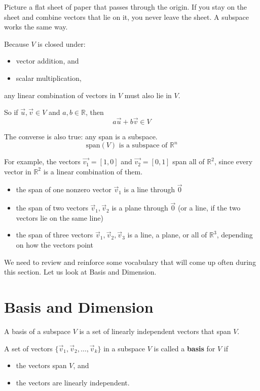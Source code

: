 Picture a flat sheet of paper that passes through the origin. If you stay on the sheet and combine vectors that lie on it, you never leave the sheet. A subspace works the same way.

Because $V$ is closed under:

\begin{itemize}
    \item vector addition, and
    \item scalar multiplication,
\end{itemize}

any linear combination of vectors in $V$ must also lie in $V$.

So if $\vec{u},\vec{v} \in V$ and $a,b \in \mathbb{R}$, then
$$a\vec{u} + b\vec{v} \in V$$

The converse is also true: any span is a subspace.
$$\text{span}(V) \text{ is a subspace of } \mathbb{R}^n$$

For example, the vectors $\vec{v_{1}}= [1, 0]$ and $\vec{v_{2}}= [0, 1]$ span all of $\mathbb{R}^2$, since every vector in $\mathbb{R}^2$ is a linear combination of them.    
\begin{itemize}
    \item the span of one nonzero vector $\vec{v}_1$ is a line through $\vec{0}$
    \item the span of two vectors $\vec{v}_1, \vec{v}_2$ is a plane through $\vec{0}$ (or a line, if the two vectors lie on the same line)
    \item the span of three vectors $\vec{v}_1, \vec{v}_2, \vec{v}_3$ is a line, a plane, or all of $\mathbb{R}^3$, depending on how the vectors point
\end{itemize}

We need to review and reinforce some vocabulary that will come up often during this section. Let us look at Basis and Dimension. 

\section{Basis and Dimension}
A basis of a subspace $V$ is a set of linearly independent vectors that span $V$. 
\begin{mdframed}[frametitle = {Basis}, style = important]
A set of vectors $\{\vec v_1, \vec v_2, \ldots, \vec v_k\}$ in a subspace $V$ is called a \textbf{basis} for $V$ if

\begin{itemize}
    \item the vectors span $V$, and
    \item the vectors are linearly independent.
\end{itemize}
\end{mdframed}

